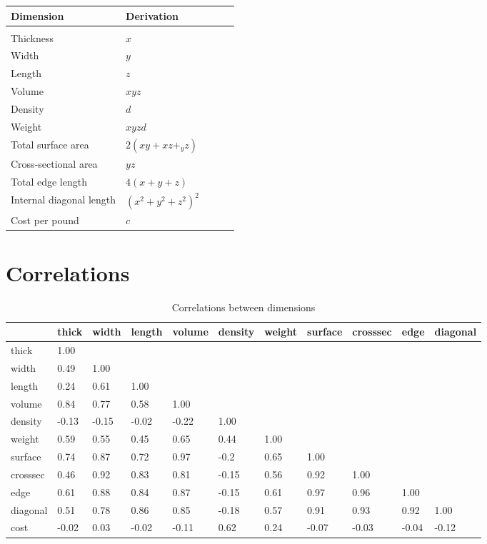\documentclass[
]{book}
\begin{document}
\begin{table}[]
\begin{tabular}{lllll}
 Dimension &  Derivation  &  \\
 \hline \\
 Thickness &  $x$  \\
 Width & $y$ \\
 Length & $z$ \\
 Volume & $xyz$ \\
 Density & $d$ \\
 Weight & $xyzd$ \\
 Total surface area & $2(xy + xz +_ yz)$ \\
 Cross-sectional area & $yz$ \\
 Total edge length & $4(x +  y + z)$ \\
 Internal diagonal length & $(x^2 + y^2 + z^2)^2$ \\
 Cost per pound & $c$
\end{tabular}
\end{table}

\hypertarget{correlations}{%
\section{Correlations}\label{correlations}}

\tiny
\begin{table}

\caption{\label{tab:unnamed-chunk-34}Correlations between dimensions}
\centering
\begin{tabular}[t]{l|l|l|l|l|l|l|l|l|l|l}
\hline
  & thick & width & length & volume & density & weight & surface & crosssec & edge & diagonal\\
\hline
thick & 1.00 &  &  &  &  &  &  &  &  & \\
\hline
width & 0.49 & 1.00 &  &  &  &  &  &  &  & \\
\hline
length & 0.24 & 0.61 & 1.00 &  &  &  &  &  &  & \\
\hline
volume & 0.84 & 0.77 & 0.58 & 1.00 &  &  &  &  &  & \\
\hline
density & -0.13 & -0.15 & -0.02 & -0.22 & 1.00 &  &  &  &  & \\
\hline
weight & 0.59 & 0.55 & 0.45 & 0.65 & 0.44 & 1.00 &  &  &  & \\
\hline
surface & 0.74 & 0.87 & 0.72 & 0.97 & -0.2 & 0.65 & 1.00 &  &  & \\
\hline
crosssec & 0.46 & 0.92 & 0.83 & 0.81 & -0.15 & 0.56 & 0.92 & 1.00 &  & \\
\hline
edge & 0.61 & 0.88 & 0.84 & 0.87 & -0.15 & 0.61 & 0.97 & 0.96 & 1.00 & \\
\hline
diagonal & 0.51 & 0.78 & 0.86 & 0.85 & -0.18 & 0.57 & 0.91 & 0.93 & 0.92 & 1.00\\
\hline
cost & -0.02 & 0.03 & -0.02 & -0.11 & 0.62 & 0.24 & -0.07 & -0.03 & -0.04 & -0.12\\
\hline
\end{tabular}
\end{table}
\end{document}
